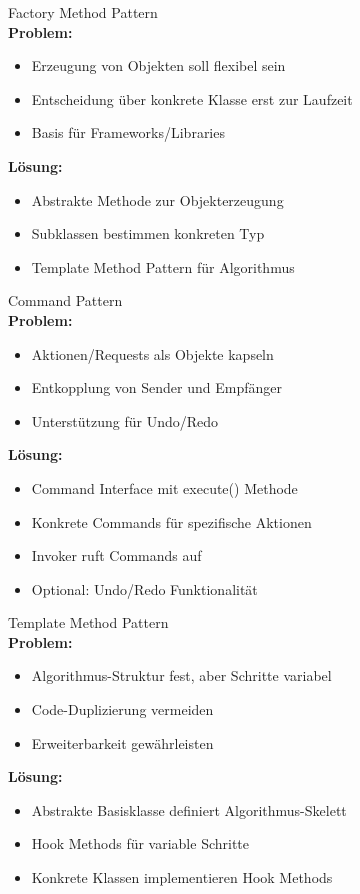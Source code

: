\begin{definition}{Factory Method Pattern}\\
\textbf{Problem:}
\begin{itemize}
   \item Erzeugung von Objekten soll flexibel sein
   \item Entscheidung über konkrete Klasse erst zur Laufzeit
   \item Basis für Frameworks/Libraries
\end{itemize}

\textbf{Lösung:}
\begin{itemize}
   \item Abstrakte Methode zur Objekterzeugung
   \item Subklassen bestimmen konkreten Typ
   \item Template Method Pattern für Algorithmus
\end{itemize}
\end{definition}

\begin{definition}{Command Pattern}\\
\textbf{Problem:}
\begin{itemize}
   \item Aktionen/Requests als Objekte kapseln
   \item Entkopplung von Sender und Empfänger
   \item Unterstützung für Undo/Redo
\end{itemize}

\textbf{Lösung:}
\begin{itemize}
   \item Command Interface mit execute() Methode
   \item Konkrete Commands für spezifische Aktionen
   \item Invoker ruft Commands auf
   \item Optional: Undo/Redo Funktionalität
\end{itemize}
\end{definition}

\begin{definition}{Template Method Pattern}\\
\textbf{Problem:}
\begin{itemize}
   \item Algorithmus-Struktur fest, aber Schritte variabel
   \item Code-Duplizierung vermeiden
   \item Erweiterbarkeit gewährleisten
\end{itemize}

\textbf{Lösung:}
\begin{itemize}
   \item Abstrakte Basisklasse definiert Algorithmus-Skelett
   \item Hook Methods für variable Schritte
   \item Konkrete Klassen implementieren Hook Methods
\end{itemize}
\end{definition}

